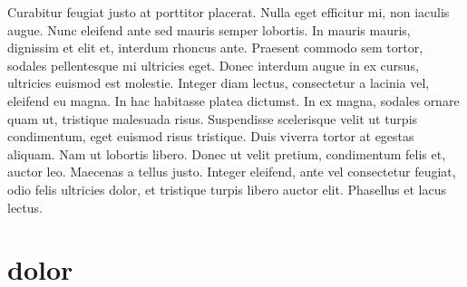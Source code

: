 	Curabitur feugiat justo at porttitor placerat. Nulla eget efficitur mi, non iaculis augue. Nunc eleifend ante sed mauris semper lobortis. In mauris mauris, dignissim et elit et, interdum rhoncus ante. Praesent commodo sem tortor, sodales pellentesque mi ultricies eget. Donec interdum augue in ex cursus, ultricies euismod est molestie. Integer diam lectus, consectetur a lacinia vel, eleifend eu magna. In hac habitasse platea dictumst. In ex magna, sodales ornare quam ut, tristique malesuada risus. Suspendisse scelerisque velit ut turpis condimentum, eget euismod risus tristique. Duis viverra tortor at egestas aliquam. Nam ut lobortis libero. Donec ut velit pretium, condimentum felis et, auctor leo. Maecenas a tellus justo. Integer eleifend, ante vel consectetur feugiat, odio felis ultricies dolor, et tristique turpis libero auctor elit. Phasellus et lacus lectus.   

   	\section*{dolor}
	
